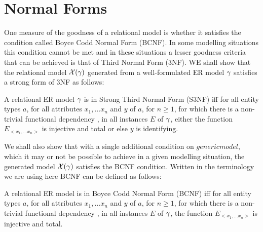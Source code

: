 \section{Normal Forms}

\noindent One measure of the goodness of a relational model is whether it satisfies the condition called Boyce Codd Normal Form (BCNF). In some modelling situations this condition cannot be 
met and in these situations a lesser goodness criteria that can be achieved is that of Third Normal Form (3NF). WE shall show that the relational model $\mathcal{X}(\gamma)$ generated from a well-formulated 
ER model $\gamma$ satisfies a strong form of 3NF as follows:

\begin{definition} %
A relational ER model $\gamma$ is in Strong Third Normal Form (S3NF)  iff
for all entity types $a$, for all attributes $x_1,...x_n$ and $y$ of $a$, for $n \geq 1$, 
for which  there is a non-trivial functional dependency , 
in all instances $E$  of $\gamma$, either the function $E_{<x_1,...x_n>}$ is injective and total
or else $y$ is identifying.
\end{definition}

We shall also show that with a single additional condition on $genericmodel$, which it may or not be possible to achieve in a given modelling situation,
the generated model $\mathcal{X}(\gamma)$ satisfies the BCNF condition.
Written in the terminology we are using here BCNF can be defined as follows:
\begin{definition} %
A relational ER model is in Boyce Codd Normal Form (BCNF)  iff
for all entity types $a$, for all attributes $x_1,...x_n$ and $y$ of $a$, for $n \geq 1$, 
for which  there is a non-trivial functional dependency , 
in all instances $E$  of $\gamma$, the function $E_{<x_1,...x_n>}$ is injective and total.  
\end{definition}




